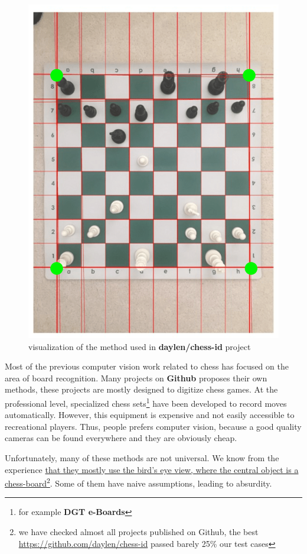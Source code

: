 \documentclass[letterpaper, 12pt]{article}
\begin{document}
\begin{figure}
\centering\vspace*{-0.25in}
\includegraphics[width=\columnwidth]{figure1.png}
\caption{visualization of the method used in \textbf{daylen/chess-id} project}
\end{figure}

Most of the previous computer vision work related to chess has focused on the
area of board recognition. Many projects on \textbf{Github} proposes their own methods, these projects are mostly designed to digitize chess games. At the professional
level, specialized chess sets\footnote{for example \textbf{DGT e-Boards}} have been developed to record moves automatically.
However, this equipment is expensive and not easily accessible to recreational
players. Thus, people prefers computer vision, because a good quality
cameras can be found everywhere and they are obviously cheap.

Unfortunately, many of these methods are not universal. We know from the
experience \ul{that they mostly use the bird's eye view, where the central
object is a chess-board}\footnote{we have checked almost all projects published
on Github, the best \url{https://github.com/daylen/chess-id} passed barely 25\%
our test cases}.
Some of them have naive assumptions, leading to absurdity.
\end{document}

